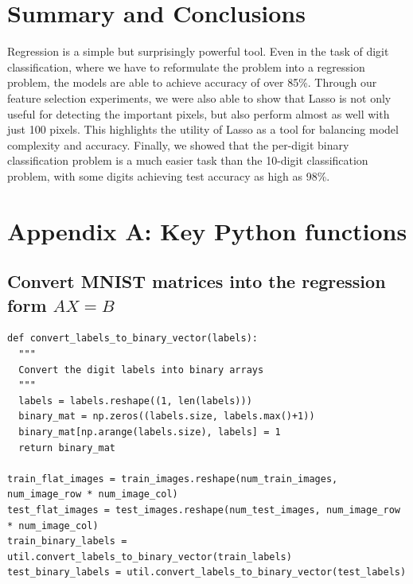 \documentclass[letterpaper, 10 pt, conference]{ieeeconf}  %
\begin{document}
\section{Summary and Conclusions}
Regression is a simple but surprisingly powerful tool.
Even in the task of digit classification, where we have to reformulate the problem into a regression problem, the models are able to achieve accuracy of over 85\%. Through our feature selection experiments, we were also able to show that Lasso is not only useful for detecting the important pixels, but also perform almost as well with just 100 pixels. This highlights the utility of Lasso as a tool for balancing model complexity and accuracy. Finally, we showed that the per-digit binary classification problem is a much easier task than the 10-digit classification problem, with some digits achieving test accuracy as high as 98\%.



\clearpage

\onecolumn
\section*{Appendix A: Key Python functions}
\subsection*{Convert MNIST matrices into the regression form $AX = B$}
\begin{verbatim}
def convert_labels_to_binary_vector(labels):
  """
  Convert the digit labels into binary arrays
  """
  labels = labels.reshape((1, len(labels)))
  binary_mat = np.zeros((labels.size, labels.max()+1))
  binary_mat[np.arange(labels.size), labels] = 1
  return binary_mat

train_flat_images = train_images.reshape(num_train_images, num_image_row * num_image_col)
test_flat_images = test_images.reshape(num_test_images, num_image_row * num_image_col)
train_binary_labels = util.convert_labels_to_binary_vector(train_labels)
test_binary_labels = util.convert_labels_to_binary_vector(test_labels)
\end{verbatim}
\end{document}
